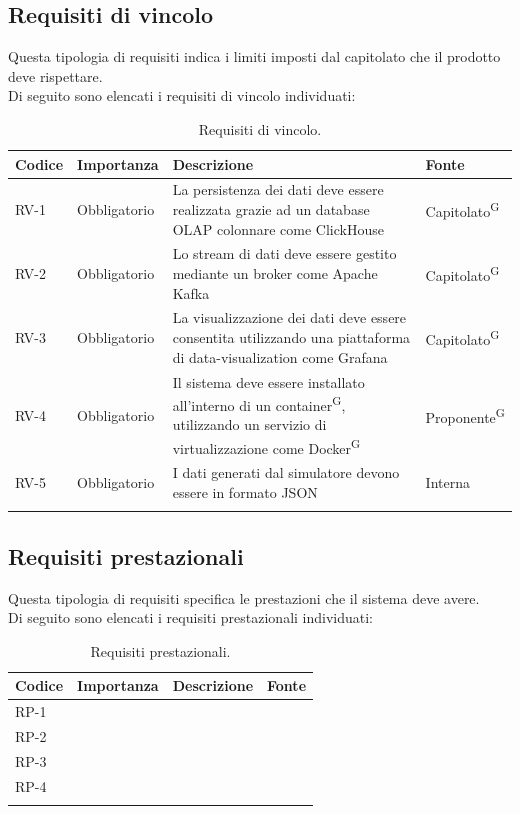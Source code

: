 \documentclass[8pt]{article}
\newcommand{\glossterm}[1]{#1\textsuperscript{G}} %
\begin{document}
\subsection{Requisiti di vincolo}
Questa tipologia di requisiti indica i limiti imposti dal capitolato che il prodotto deve rispettare. \\
Di seguito sono elencati i requisiti di vincolo individuati:
\begin{longtable}{p{1.2cm} p{2cm} p{8cm} p{3cm}}
    \toprule
    \textbf{Codice} & \textbf{Importanza} & \textbf{Descrizione} & \textbf{Fonte} \\
		\midrule
            RV-1 & Obbligatorio & La persistenza dei dati deve essere realizzata grazie ad un database OLAP colonnare come ClickHouse & \glossterm{Capitolato} \\
            RV-2 & Obbligatorio & Lo stream di dati deve essere gestito mediante un broker come Apache Kafka & \glossterm{Capitolato} \\
            RV-3 & Obbligatorio & La visualizzazione dei dati deve essere consentita utilizzando una piattaforma di data-visualization come Grafana & \glossterm{Capitolato} \\
            RV-4 & Obbligatorio & Il sistema deve essere installato all'interno di un \glossterm{container}, utilizzando un servizio di virtualizzazione come \glossterm{Docker} & \glossterm{Proponente} \\
            RV-5 & Obbligatorio & I dati generati dal simulatore devono essere in formato JSON & Interna \\
		\bottomrule
	\caption{Requisiti di vincolo.}
	\label{table:Requisiti di vincolo}
\end{longtable}

\subsection{Requisiti prestazionali}
Questa tipologia di requisiti specifica le prestazioni che il sistema deve avere. \\
Di seguito sono elencati i requisiti prestazionali individuati:
\begin{longtable}{p{1.2cm} p{2cm} p{8cm} p{3cm}}
    \toprule
    \textbf{Codice} & \textbf{Importanza} & \textbf{Descrizione} & \textbf{Fonte} \\
		\midrule
            RP-1 &  &  &  \\
            RP-2 &  &  &  \\
            RP-3 &  &  &  \\
            RP-4 &  &  &  \\
		\bottomrule
	\caption{Requisiti prestazionali.}
	\label{table:Requisiti prestazionali}
\end{longtable}
\end{document}
